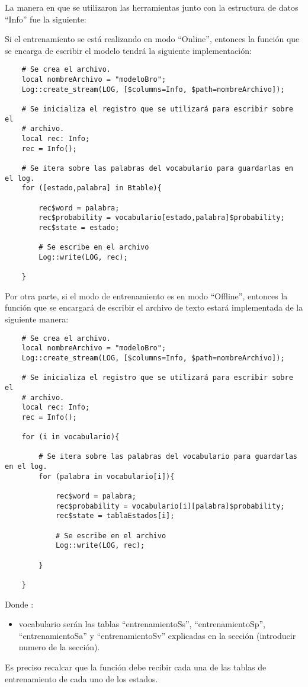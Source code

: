     La manera en que se utilizaron las herramientas junto con la estructura de datos “Info” fue la siguiente:

Si el entrenamiento se está realizando en modo “Online”, entonces la función que se encarga de escribir el modelo tendrá la siguiente implementación:

\begin{verbatim}
    # Se crea el archivo.
    local nombreArchivo = "modeloBro";
    Log::create_stream(LOG, [$columns=Info, $path=nombreArchivo]);

    # Se inicializa el registro que se utilizará para escribir sobre el
    # archivo.
    local rec: Info;
    rec = Info();

    # Se itera sobre las palabras del vocabulario para guardarlas en el log.
    for ([estado,palabra] in Btable){

        rec$word = palabra;
        rec$probability = vocabulario[estado,palabra]$probability;
        rec$state = estado;

        # Se escribe en el archivo
        Log::write(LOG, rec);
        
    }
\end{verbatim}

Por otra parte, si el modo de entrenamiento es en modo “Offline”, entonces la función que se encargará de escribir el archivo de texto estará implementada de la siguiente manera:

\begin{verbatim}
    # Se crea el archivo.
    local nombreArchivo = "modeloBro";
    Log::create_stream(LOG, [$columns=Info, $path=nombreArchivo]);

    # Se inicializa el registro que se utilizará para escribir sobre el
    # archivo.
    local rec: Info;
    rec = Info();

    for (i in vocabulario){

        # Se itera sobre las palabras del vocabulario para guardarlas en el log.
        for (palabra in vocabulario[i]){

            rec$word = palabra;
            rec$probability = vocabulario[i][palabra]$probability;
            rec$state = tablaEstados[i];

            # Se escribe en el archivo
            Log::write(LOG, rec);
            
        }

    }
\end{verbatim}
Donde :

\begin{itemize}
\item vocabulario serán las tablas “entrenamientoSs”, “entrenamientoSp”, “entrenamientoSa” y “entrenamientoSv” explicadas en la sección (introducir numero de la sección).
\end{itemize}

Es preciso recalcar que la función debe recibir cada una de las tablas de entrenamiento de cada uno de los estados.
